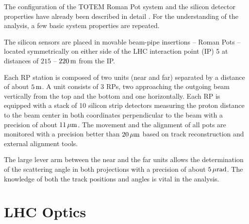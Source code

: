 \documentclass[doublecol]{../macros/epl2}
\def\un#1{\,{\rm #1}}
\begin{document}
The configuration of the TOTEM Roman Pot system and the silicon detector properties have already been described in detail \cite{jinst,epl95,epl96}. For the understanding of the analysis, a few basic  system  properties are repeated. 

The silicon sensors are placed in movable beam-pipe insertions -- Roman Pots -- located symmetrically on either side of the LHC interaction point (IP) 5 at distances of $215$ -- $220\un{m}$ from the IP.

Each RP station is composed of two units (near and far) separated by a distance of about $5\un{m}$. A unit consists of 3 RPs, two approaching the outgoing beam vertically from the top and the bottom and one horizontally. Each RP is equipped with a stack of 10 silicon strip detectors measuring the proton distance to the beam center in both coordinates perpendicular to the beam with a precision of about $11\un{\mu m}$.
The movement and the alignment of all pots are monitored with a precision better than $20\un{\mu m}$ based on track reconstruction and external alignment tools.

The large lever arm between the near and the far units allows the determination of the scattering angle in both projections with a precision of about $5\un{\mu rad}$. The know\-ledge of both the track positions and angles is vital in the analysis. 



\section{LHC Optics}
\end{document}
